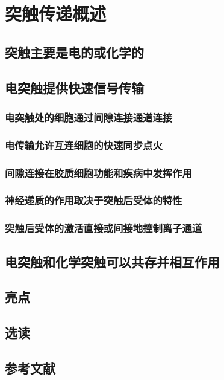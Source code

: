 \chapter{突触传递概述}

\section{突触主要是电的或化学的}

\section{电突触提供快速信号传输}
\subsection{电突触处的细胞通过间隙连接通道连接}
\subsection{电传输允许互连细胞的快速同步点火}
\subsection{间隙连接在胶质细胞功能和疾病中发挥作用}
\subsection{神经递质的作用取决于突触后受体的特性}
\subsection{突触后受体的激活直接或间接地控制离子通道}

\section{电突触和化学突触可以共存并相互作用}

\section{亮点}

\section{选读}

\section{参考文献}